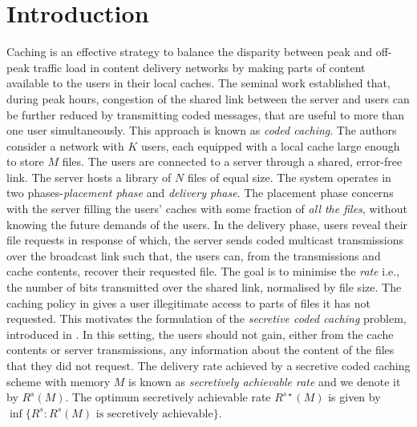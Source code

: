 \documentclass[conference]{IEEEtran}
\begin{document}
\section{Introduction}
\label{sec1}	
Caching is an effective strategy to balance the disparity between peak and off-peak traffic load in content delivery networks by making parts of content available to the users in their local caches. The seminal work \cite{MaNcentCc} established that, during peak hours, congestion of the shared link between the server and users can be further reduced by transmitting coded messages, that are useful to more than one user simultaneously. This approach is known as \emph{coded caching}. The authors consider a network with $K$ users, each equipped with a local cache large enough to store $M$ files. The users are connected to a server through a shared, error-free link. The server hosts a library of $N$ files of equal size. The system operates in two phases-\emph{placement phase} and \emph{delivery phase}. The placement phase concerns with the server filling the users' caches with some fraction of \emph{all the files}, without knowing the future demands of the users. In the delivery phase, users reveal their file requests in response of which, the server sends coded multicast transmissions over the broadcast link such that, the users can, from the transmissions and cache contents, recover their requested file. The goal is to minimise the \emph{rate} i.e., the number of bits transmitted over the shared link, normalised by file size. 
The caching policy in \cite{MaNcentCc} gives a user illegitimate access to parts of files it has not requested. This motivates the formulation of the \emph{secretive coded caching} problem, introduced in \cite{SecretiveCc}. In this setting, the users should not gain, either from the cache contents or server transmissions, any information about the content of the files that they did not request. The delivery rate achieved by a secretive coded caching scheme with memory $M$ is known as \emph{secretively achievable rate} and we denote it by $R^s(M)$. The optimum secretively achievable rate $R^{s\star}(M)$ is given by $\inf\{R^s:R^s(M) \text{ is secretively achievable}\}$.
\end{document}
